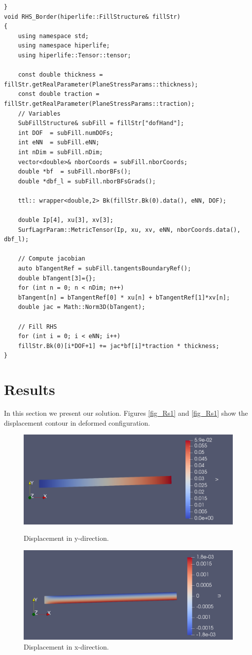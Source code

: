 \documentclass[]{article}
\begin{document}
\begin{lstlisting}
}
void RHS_Border(hiperlife::FillStructure& fillStr)
{
	using namespace std;
	using namespace hiperlife;
	using hiperlife::Tensor::tensor;
	
	const double thickness = fillStr.getRealParameter(PlaneStressParams::thickness);
	const double traction = fillStr.getRealParameter(PlaneStressParams::traction);
	// Variables
	SubFillStructure& subFill = fillStr["dofHand"];
	int DOF  = subFill.numDOFs;
	int eNN  = subFill.eNN;
	int nDim = subFill.nDim;
	vector<double>& nborCoords = subFill.nborCoords;
	double *bf  = subFill.nborBFs();
	double *dbf_l = subFill.nborBFsGrads();
	
	ttl:: wrapper<double,2> Bk(fillStr.Bk(0).data(), eNN, DOF);
	
	double Ip[4], xu[3], xv[3];
	SurfLagrParam::MetricTensor(Ip, xu, xv, eNN, nborCoords.data(), dbf_l);
	
	// Compute jacobian
	auto bTangentRef = subFill.tangentsBoundaryRef();
	double bTangent[3]={};
	for (int n = 0; n < nDim; n++)
	bTangent[n] = bTangentRef[0] * xu[n] + bTangentRef[1]*xv[n];
	double jac = Math::Norm3D(bTangent);
	
	// Fill RHS
	for (int i = 0; i < eNN; i++)
	fillStr.Bk(0)[i*DOF+1] += jac*bf[i]*traction * thickness;
}
\end{lstlisting}
\section{Results} \label{sec: rst}
In this section we present our solution. Figures \ref{fig_Rs1} and \ref{fig_Rs1} show the displacement contour in deformed configuration.

\begin{figure}[htbp]
	\centering
		\includegraphics[width=\textwidth]{Figures/result1.png}
		\caption{Displacement in y-direction.}
		\label{fig_Rs1}
	\hfill
		\includegraphics[width=\textwidth]{Figures/result2.png}
		\caption{Displacement in x-direction.}
	\label{fig_Rs2}
\end{figure}



\end{document}
